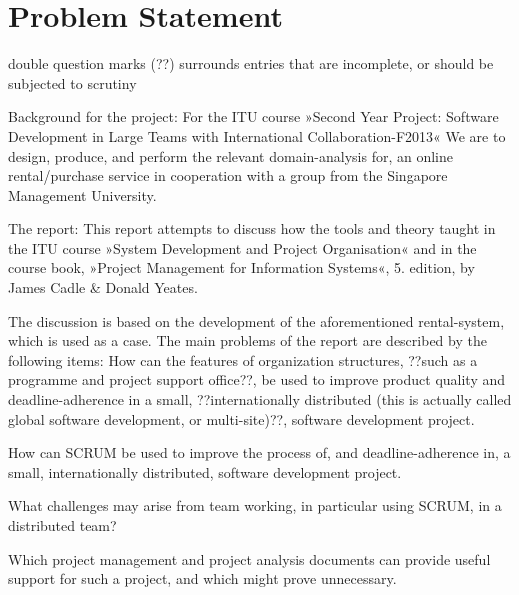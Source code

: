 \section{Problem Statement}
\label{sec:problemstatement}
double question marks (??) surrounds entries that are incomplete, or should be
subjected to scrutiny

Background for the project:
For the ITU course »Second Year Project: Software Development in Large Teams with
International Collaboration-F2013«
We are to design, produce, and perform the relevant domain-analysis for,
an online rental/purchase service in cooperation with a group from the Singapore
Management University.

The report:
This report attempts to discuss how the tools and theory taught in the
ITU course »System Development and Project Organisation« and in the
course book, »Project Management for Information Systems«, 5. edition, by 
James Cadle \& Donald Yeates.

The discussion is based on the development of the aforementioned
rental-system, which is used as a case.
The main problems of the report are described by the following items:
How can the features of organization structures, ??such as a
programme and project support office??, be used to improve
product quality and deadline-adherence in a small,
??internationally distributed (this is actually called global
software development, or multi-site)??,  software development project.

How can SCRUM be used to improve the process of, and 
deadline-adherence in, a small, internationally distributed,
software development project.

What challenges may arise from team working, in particular
using SCRUM, in a distributed team?

Which project management and project analysis documents can
provide useful support for such a project, and which might
prove unnecessary.
